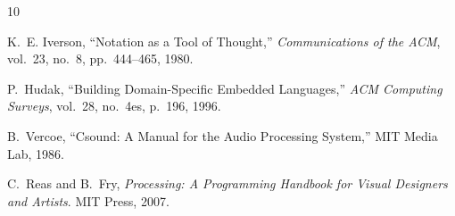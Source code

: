 \documentclass[11pt]{article}
\begin{document}
\begin{thebibliography}{10}

K.~E. Iverson, ``Notation as a Tool of Thought,''
\emph{Communications of the ACM}, vol.~23, no.~8, pp.~444--465, 1980.

P.~Hudak, ``Building Domain-Specific Embedded Languages,''
\emph{ACM Computing Surveys}, vol.~28, no.~4es, p.~196, 1996.

B.~Vercoe, ``Csound: A Manual for the Audio Processing System,''
MIT Media Lab, 1986.

C.~Reas and B.~Fry, \emph{Processing: A Programming Handbook for Visual Designers and Artists}.
MIT Press, 2007.

\end{thebibliography}
\end{document}
